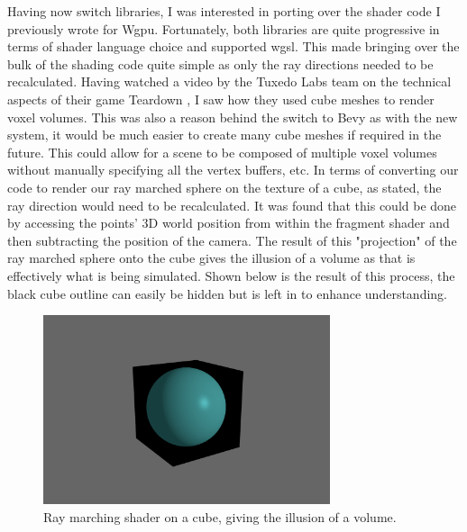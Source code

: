 \documentclass[titlepage]{article}
\begin{document}
Having now switch libraries, I was interested in porting over the shader code I previously wrote for Wgpu. Fortunately, both libraries are quite progressive in terms of shader language choice and supported \acrshort{wgsl}. This made bringing over the bulk of the shading code quite simple as only the ray directions needed to be recalculated. Having watched a video by the Tuxedo Labs team on the technical aspects of their game Teardown \cite{teardown:tech}, I saw how they used cube meshes to render voxel volumes. This was also a reason behind the switch to Bevy as with the new system, it would be much easier to create many cube meshes if required in the future. This could allow for a scene to be composed of multiple voxel volumes without manually specifying all the vertex buffers, etc. In terms of converting our code to render our ray marched sphere on the texture of a cube, as stated, the ray direction would need to be recalculated. It was found that this could be done by accessing the points' 3D world position from within the fragment shader and then subtracting the position of the camera. The result of this "projection" of the ray marched sphere onto the cube gives the illusion of a volume as that is effectively what is being simulated. Shown below is the result of this process, the black cube outline can easily be hidden but is left in to enhance understanding.

\begin{figure}[htp]
    \centering
    \includegraphics[width=0.75\textwidth]{cube.png}
    \caption{Ray marching shader on a cube, giving the illusion of a volume.}
\end{figure}
\FloatBarrier
\end{document}
